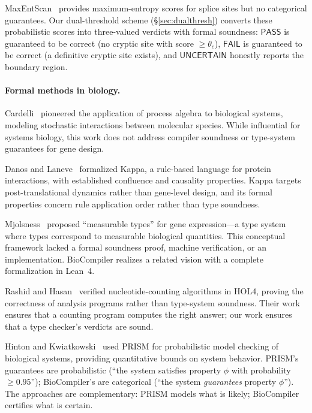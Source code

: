 \documentclass[acmsmall,review,anonymous]{acmart}
\newcommand{\PASS}{\ensuremath{\mathsf{PASS}}\xspace}
\newcommand{\FAIL}{\ensuremath{\mathsf{FAIL}}\xspace}
\newcommand{\UNCERTAIN}{\ensuremath{\mathsf{UNCERTAIN}}\xspace}
\begin{document}
MaxEntScan~\cite{yeo2004maxentscan} provides maximum-entropy scores
for splice sites but no categorical guarantees.  Our dual-threshold
scheme (\S\ref{sec:dualthresh}) converts these probabilistic scores into
three-valued verdicts with formal soundness: \PASS{} is guaranteed to be
correct (no cryptic site with score $\ge \theta_c$), \FAIL{} is
guaranteed to be correct (a definitive cryptic site exists), and
\UNCERTAIN{} honestly reports the boundary region.

\paragraph{Formal methods in biology.}
Cardelli~\cite{cardelli2008process} pioneered the application of process
algebra to biological systems, modeling stochastic interactions between
molecular species.  While influential for systems biology, this work does
not address compiler soundness or type-system guarantees for gene design.

Danos and Laneve~\cite{danos2004formal} formalized Kappa, a rule-based
language for protein interactions, with established confluence and
causality properties.  Kappa targets post-translational dynamics rather
than gene-level design, and its formal properties concern rule
application order rather than type soundness.

Mjolsness~\cite{mjolsness2010measurable} proposed ``measurable types''
for gene expression---a type system where types correspond to measurable
biological quantities.  This conceptual framework lacked a formal
soundness proof, machine verification, or an implementation.  BioCompiler
realizes a related vision with a complete formalization in Lean~4.

Rashid and Hasan~\cite{rashid2017hol4} verified nucleotide-counting
algorithms in HOL4, proving the correctness of analysis programs rather
than type-system soundness.  Their work ensures that a counting program
computes the right answer; our work ensures that a type checker's
verdicts are sound.

Hinton and Kwiatkowski~\cite{hinton2006prism} used PRISM for
probabilistic model checking of biological systems, providing
quantitative bounds on system behavior.  PRISM's guarantees are
probabilistic (``the system satisfies property $\phi$ with probability
$\ge 0.95$''); BioCompiler's are categorical (``the system
\emph{guarantees} property $\phi$'').  The approaches are complementary:
PRISM models what is likely; BioCompiler certifies what is certain.
\end{document}
